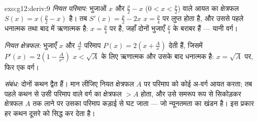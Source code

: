 \begin{solution}{exo:g12:deriv:9}
\emph{नियत परिमाप:} भुजाओं $x$ और $\frac{p}{2} - x$ ($0 < x < \frac p2$) वाले आयत का क्षेत्रफल $S(x) = x\left(\frac p2 - x\right)$
है। तब $S'(x) = \frac p2 - 2x$ $x = \frac p4$ पर लुप्त होता है, और उससे पहले धनात्मक तथा बाद में ऋणात्मक
है:  $x = \frac{p}{4}$ पर है, जहाँ दोनों भुजाएँ $\frac p4$ के बराबर हैं --- यानी वर्ग।

\emph{नियत क्षेत्रफल:} भुजाएँ $x$ और $\frac Ax$ परिमाप $P(x) = 2\left(x + \frac Ax\right)$ देती हैं, जिसमें
$P'(x) = 2\left(1 - \frac{A}{x^2}\right)$ $x < \sqrt A$ के लिए ऋणात्मक और उसके बाद धनात्मक है:  $x = \sqrt{A}$ पर, फिर एक
वर्ग।

\emph{संबंध:} दोनों कथन द्वैत हैं। मान लीजिए नियत क्षेत्रफल $A$ पर परिमाप
को कोई अ-वर्ग आयत  करता; तब पहले कथन से उसी परिमाप वाले वर्ग का
क्षेत्रफल $> A$ होता, और उसे समरूप रूप से सिकोड़कर क्षेत्रफल $A$ तक लाने
पर उसका परिमाप कड़ाई से घट जाता --- जो न्यूनतमता का खंडन है। इस प्रकार हर कथन
दूसरे को सिद्ध कर देता है।
\end{solution}

